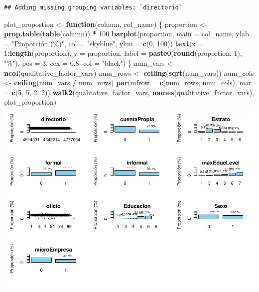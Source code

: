 \documentclass[
]{article}
\newenvironment{Shaded}{\begin{snugshade}}{\end{snugshade}}
\newcommand{\AttributeTok}[1]{\textcolor[rgb]{0.13,0.29,0.53}{#1}}
\newcommand{\ControlFlowTok}[1]{\textcolor[rgb]{0.13,0.29,0.53}{\textbf{#1}}}
\newcommand{\DecValTok}[1]{\textcolor[rgb]{0.00,0.00,0.81}{#1}}
\newcommand{\FloatTok}[1]{\textcolor[rgb]{0.00,0.00,0.81}{#1}}
\newcommand{\FunctionTok}[1]{\textcolor[rgb]{0.13,0.29,0.53}{\textbf{#1}}}
\newcommand{\NormalTok}[1]{#1}
\newcommand{\OtherTok}[1]{\textcolor[rgb]{0.56,0.35,0.01}{#1}}
\newcommand{\SpecialCharTok}[1]{\textcolor[rgb]{0.81,0.36,0.00}{\textbf{#1}}}
\newcommand{\StringTok}[1]{\textcolor[rgb]{0.31,0.60,0.02}{#1}}
\begin{document}
\begin{verbatim}
## Adding missing grouping variables: `directorio`
\end{verbatim}

\begin{Shaded}
\begin{Highlighting}[]
\NormalTok{plot\_proportion }\OtherTok{\textless{}{-}} \ControlFlowTok{function}\NormalTok{(column, col\_name) \{}
\NormalTok{  proportion }\OtherTok{\textless{}{-}} \FunctionTok{prop.table}\NormalTok{(}\FunctionTok{table}\NormalTok{(column)) }\SpecialCharTok{*} \DecValTok{100}
  \FunctionTok{barplot}\NormalTok{(proportion, }\AttributeTok{main =}\NormalTok{ col\_name, }\AttributeTok{ylab =} \StringTok{"Proporción (\%)"}\NormalTok{, }\AttributeTok{col =} \StringTok{"skyblue"}\NormalTok{, }\AttributeTok{ylim =} \FunctionTok{c}\NormalTok{(}\DecValTok{0}\NormalTok{, }\DecValTok{100}\NormalTok{))}
  \FunctionTok{text}\NormalTok{(}\AttributeTok{x =} \DecValTok{1}\SpecialCharTok{:}\FunctionTok{length}\NormalTok{(proportion), }\AttributeTok{y =}\NormalTok{ proportion, }
       \AttributeTok{label =} \FunctionTok{paste0}\NormalTok{(}\FunctionTok{round}\NormalTok{(proportion, }\DecValTok{1}\NormalTok{), }\StringTok{"\%"}\NormalTok{), }\AttributeTok{pos =} \DecValTok{3}\NormalTok{, }\AttributeTok{cex =} \FloatTok{0.8}\NormalTok{, }\AttributeTok{col =} \StringTok{"black"}\NormalTok{)}
\NormalTok{\}}
\NormalTok{num\_vars }\OtherTok{\textless{}{-}} \FunctionTok{ncol}\NormalTok{(qualitative\_factor\_vars)}
\NormalTok{num\_rows }\OtherTok{\textless{}{-}} \FunctionTok{ceiling}\NormalTok{(}\FunctionTok{sqrt}\NormalTok{(num\_vars))}
\NormalTok{num\_cols }\OtherTok{\textless{}{-}} \FunctionTok{ceiling}\NormalTok{(num\_vars }\SpecialCharTok{/}\NormalTok{ num\_rows)}
\FunctionTok{par}\NormalTok{(}\AttributeTok{mfrow =} \FunctionTok{c}\NormalTok{(num\_rows, num\_cols), }\AttributeTok{mar =} \FunctionTok{c}\NormalTok{(}\DecValTok{5}\NormalTok{, }\DecValTok{5}\NormalTok{, }\DecValTok{2}\NormalTok{, }\DecValTok{2}\NormalTok{))  }
\FunctionTok{walk2}\NormalTok{(qualitative\_factor\_vars, }\FunctionTok{names}\NormalTok{(qualitative\_factor\_vars), plot\_proportion)}
\end{Highlighting}
\end{Shaded}

\includegraphics{Taller-1_files/figure-latex/unnamed-chunk-13-1.pdf}
\end{document}
